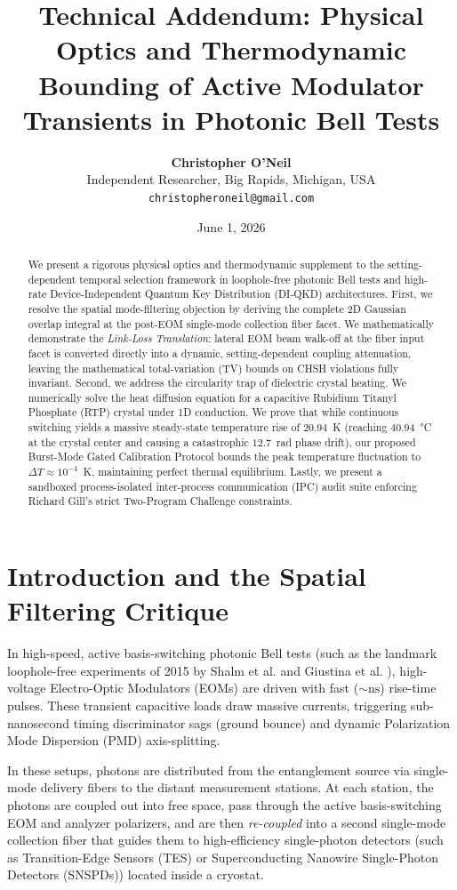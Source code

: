 \documentclass[11pt,twocolumn]{article}
\title{\textbf{Technical Addendum: Physical Optics and Thermodynamic Bounding of Active Modulator Transients in Photonic Bell Tests}}
\author{\textbf{Christopher O'Neil} \\
\small{Independent Researcher, Big Rapids, Michigan, USA} \\
\small{\texttt{christopheroneil@gmail.com}}
}
\date{June 1, 2026}
\begin{document}
\maketitle

\begin{abstract}
We present a rigorous physical optics and thermodynamic supplement to the setting-dependent temporal selection framework in loophole-free photonic Bell tests and high-rate Device-Independent Quantum Key Distribution (DI-QKD) architectures. First, we resolve the spatial mode-filtering objection by deriving the complete 2D Gaussian overlap integral at the post-EOM single-mode collection fiber facet. We mathematically demonstrate the \textit{Link-Loss Translation}: lateral EOM beam walk-off at the fiber input facet is converted directly into a dynamic, setting-dependent coupling attenuation, leaving the mathematical total-variation (TV) bounds on CHSH violations fully invariant. Second, we address the circularity trap of dielectric crystal heating. We numerically solve the heat diffusion equation for a capacitive Rubidium Titanyl Phosphate (RTP) crystal under 1D conduction. We prove that while continuous switching yields a massive steady-state temperature rise of $20.94$~K (reaching $40.94$~°C at the crystal center and causing a catastrophic $12.7$~rad phase drift), our proposed Burst-Mode Gated Calibration Protocol bounds the peak temperature fluctuation to $\Delta T \approx 10^{-4}$~K, maintaining perfect thermal equilibrium. Lastly, we present a sandboxed process-isolated inter-process communication (IPC) audit suite enforcing Richard Gill's strict Two-Program Challenge constraints.
\end{abstract}

\section{Introduction and the Spatial Filtering Critique}
In high-speed, active basis-switching photonic Bell tests (such as the landmark loophole-free experiments of 2015 by Shalm et al. \cite{shalm2015} and Giustina et al. \cite{giustina2015}), high-voltage Electro-Optic Modulators (EOMs) are driven with fast ($\sim \text{ns}$) rise-time pulses. These transient capacitive loads draw massive currents, triggering sub-nanosecond timing discriminator sags (ground bounce) and dynamic Polarization Mode Dispersion (PMD) axis-splitting. 

In these setups, photons are distributed from the entanglement source via single-mode delivery fibers to the distant measurement stations. At each station, the photons are coupled out into free space, pass through the active basis-switching EOM and analyzer polarizers, and are then \textit{re-coupled} into a second single-mode collection fiber that guides them to high-efficiency single-photon detectors (such as Transition-Edge Sensors (TES) or Superconducting Nanowire Single-Photon Detectors (SNSPDs)) located inside a cryostat.
\end{document}
